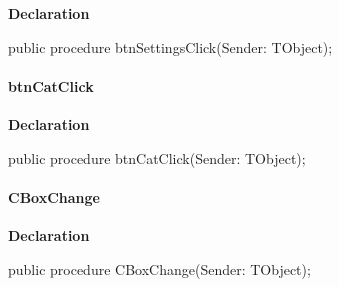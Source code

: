 \documentclass{report}
\newif\ifpdf
\begin{document}
\label{manager.TMnFrm-btnSettingsClick}
\begin{list}{}{
\setlength{\itemindent}{0cm}
\setlength{\listparindent}{0cm}
\setlength{\leftmargin}{\evensidemargin}
\addtolength{\leftmargin}{\tmplength}
\settowidth{\labelsep}{X}
\addtolength{\leftmargin}{\labelsep}
\setlength{\labelwidth}{\tmplength}
}
\item[\textbf{Declaration}\hfill]
\ifpdf
\begin{flushleft}
\fi
\begin{ttfamily}
public procedure btnSettingsClick(Sender: TObject);\end{ttfamily}

\ifpdf
\end{flushleft}
\fi

\end{list}
\paragraph*{btnCatClick}\hspace*{\fill}

\label{manager.TMnFrm-btnCatClick}
\begin{list}{}{
\setlength{\itemindent}{0cm}
\setlength{\listparindent}{0cm}
\setlength{\leftmargin}{\evensidemargin}
\addtolength{\leftmargin}{\tmplength}
\settowidth{\labelsep}{X}
\addtolength{\leftmargin}{\labelsep}
\setlength{\labelwidth}{\tmplength}
}
\item[\textbf{Declaration}\hfill]
\ifpdf
\begin{flushleft}
\fi
\begin{ttfamily}
public procedure btnCatClick(Sender: TObject);\end{ttfamily}

\ifpdf
\end{flushleft}
\fi

\end{list}
\paragraph*{CBoxChange}\hspace*{\fill}

\label{manager.TMnFrm-CBoxChange}
\begin{list}{}{
\setlength{\itemindent}{0cm}
\setlength{\listparindent}{0cm}
\setlength{\leftmargin}{\evensidemargin}
\addtolength{\leftmargin}{\tmplength}
\settowidth{\labelsep}{X}
\addtolength{\leftmargin}{\labelsep}
\setlength{\labelwidth}{\tmplength}
}
\item[\textbf{Declaration}\hfill]
\ifpdf
\begin{flushleft}
\fi
\begin{ttfamily}
public procedure CBoxChange(Sender: TObject);\end{ttfamily}

\ifpdf
\end{flushleft}
\fi

\end{list}
\end{document}

